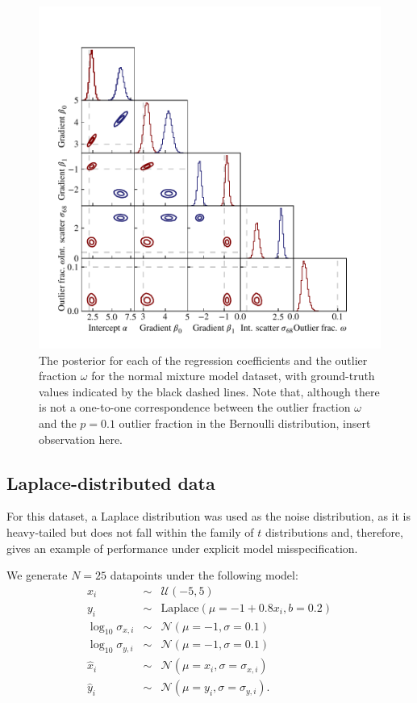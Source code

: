 \documentclass[fleqn,usenatbib]{mnras}
\begin{document}
\begin{figure}
    \includegraphics[width=\columnwidth]{graphics/corner_gaussian_mix.pdf}
    \caption{The posterior for each of the regression coefficients and the
    outlier fraction $\omega$ for the normal mixture model dataset, with
    ground-truth values indicated by the black dashed lines. Note that, although
    there is not a one-to-one correspondence between the outlier fraction
    $\omega$ and the $p = 0.1$ outlier fraction in the Bernoulli distribution,
    {\color{red} insert observation here}.}
    \label{fig:results.gmm.corner}
\end{figure}

\subsection{Laplace-distributed data}
\label{sec:results.laplace}

For this dataset, a Laplace distribution was used as the noise distribution, as
it is heavy-tailed but does not fall within the family of $t$ distributions and,
therefore, gives an example of performance under explicit model
misspecification.

We generate $N = 25$ datapoints under the following model:
\begin{eqnarray}
    x_i &\sim& \mathcal U (-5, 5) \\
    y_i &\sim& \mathrm{Laplace} (\mu = -1 + 0.8 x_i, b = 0.2) \\
    \log_{10} \sigma_{x, i} &\sim& \mathcal N (\mu = -1, \sigma = 0.1) \\
    \log_{10} \sigma_{y, i} &\sim& \mathcal N (\mu = -1, \sigma = 0.1) \\
    \hat{x}_i &\sim& \mathcal N (\mu = x_i, \sigma = \sigma_{x, i}) \\
    \hat{y}_i &\sim& \mathcal N (\mu = y_i, \sigma = \sigma_{y, i}).
\end{eqnarray}
\end{document}

